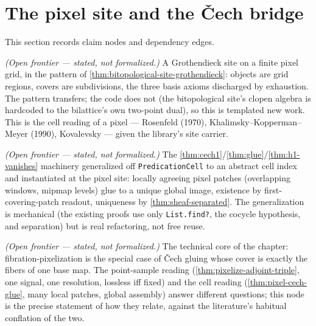 \section{The pixel site and the \v{C}ech bridge}

This section records claim nodes and dependency edges.

\begin{proposition}\label{thm:pixel-site}\notready{}
\emph{(Open frontier --- stated, not formalized.)} A Grothendieck site on a finite pixel
grid, in the pattern of \cref{thm:bitopological-site-grothendieck}: objects are grid
regions, covers are subdivisions, the three basis axioms discharged by exhaustion. The
pattern transfers; the code does not (the bitopological site's clopen algebra is
hardcoded to the bilattice's own two-point dual), so this is templated new work. This is
the cell reading of a pixel --- Rosenfeld (1970), Khalimsky--Kopperman--Meyer (1990),
Kovalevsky --- given the library's site carrier.
\end{proposition}

\begin{theorem}\label{thm:pixel-cech-glue}\notready{}
\emph{(Open frontier --- stated, not formalized.)} The
\cref{thm:cech1}/\cref{thm:glue}/\cref{thm:h1-vanishes} machinery generalized off
\texttt{PredicationCell} to an abstract cell index and instantiated at the pixel site:
locally agreeing pixel patches (overlapping windows, mipmap levels) glue to a unique
global image, existence by first-covering-patch readout, uniqueness by
\cref{thm:sheaf-separated}. The generalization is mechanical (the existing proofs use
only \texttt{List.find?}, the cocycle hypothesis, and separation) but is real
refactoring, not free reuse.
\end{theorem}

\begin{theorem}\label{thm:fibration-cech-bridge}\notready{}
\emph{(Open frontier --- stated, not formalized.)} The technical core of the chapter:
fibration-pixelization is the special case of \v{C}ech gluing whose cover is exactly the
fibers of one base map. The point-sample reading (\cref{thm:pixelize-adjoint-triple},
one signal, one resolution, lossless iff fixed) and the cell reading
(\cref{thm:pixel-cech-glue}, many local patches, global assembly) answer different
questions; this node is the precise statement of how they relate, against the
literature's habitual conflation of the two.
\end{theorem}
